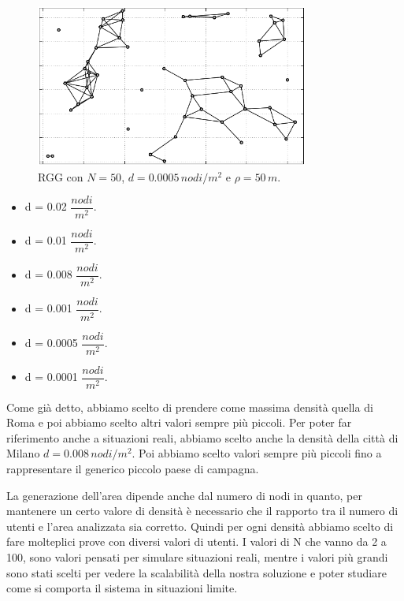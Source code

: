 \begin{figure}[t]
	\centering
	\includegraphics[width=0.8\textwidth, keepaspectratio]{Images/reti/RandomGeometricGraph_15}
	\caption[RGG con configurazione]{RGG con $ N=50 $, $ d=0.0005 \, nodi/m^2$ e $ \rho=50\,m$.}
	\label{fig:rgg_gen_02}
\end{figure}

\begin{itemize}
	\item d = 0.02 $ \dfrac{nodi}{m^{2}} $.
	\item d = 0.01 $ \dfrac{nodi}{m^{2}} $.
	\item d = 0.008 $ \dfrac{nodi}{m^{2}} $.
	\item d = 0.001 $ \dfrac{nodi}{m^{2}} $.
	\item d = 0.0005 $ \dfrac{nodi}{m^{2}} $.
	\item d = 0.0001 $ \dfrac{nodi}{m^{2}} $.
\end{itemize}
Come già detto, abbiamo scelto di prendere come massima densità quella di Roma e poi abbiamo scelto altri valori sempre più piccoli. Per poter far riferimento anche a situazioni reali, abbiamo scelto anche la densità della città di Milano $ d=0.008\,nodi/m^2 $. Poi abbiamo scelto valori sempre più piccoli fino a rappresentare il generico piccolo paese di campagna.

La generazione dell'area dipende anche dal numero di nodi in quanto, per mantenere un certo valore di densità è necessario che il rapporto tra il numero di utenti e l'area analizzata sia corretto. Quindi per ogni densità abbiamo scelto di fare molteplici prove con diversi valori di utenti. I valori di N che vanno da 2 a 100, sono valori pensati per simulare situazioni reali, mentre i valori più grandi sono stati scelti per vedere la scalabilità della nostra soluzione e poter studiare come si comporta il sistema in situazioni limite.
\medskip

